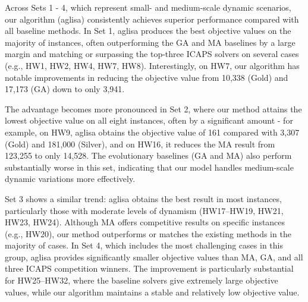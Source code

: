 \documentclass[preprint,12pt]{elsarticle}
\begin{document}
Across Sets 1 - 4, which represent small- and medium-scale dynamic scenarios, our algorithm (\gls{aglisa}) consistently achieves superior performance compared with all baseline methods. In Set 1, \gls{aglisa} produces the best objective values on the majority of instances, often outperforming the GA and MA baselines by a large margin and matching or surpassing the top-three ICAPS solvers on several cases (e.g., HW1, HW2, HW4, HW7, HW8). Interestingly, on HW7, our algorithm has notable improvements in reducing the objective value from 10,338 (Gold) and 17,173 (GA) down to only 3,941.

The advantage becomes more pronounced in Set 2, where our method attains the lowest objective value on all eight instances, often by a significant amount  - for example, on HW9, \gls{aglisa} obtains the objective value of 161 compared with 3,307 (Gold) and 181,000 (Silver), and on HW16, it reduces the MA result from 123,255 to only 14,528. The evolutionary baselines (GA and MA) also perform substantially worse in this set, indicating that our model handles medium-scale dynamic variations more effectively.

Set 3 shows a similar trend: \gls{aglisa} obtains the best result in most instances, particularly those with moderate levels of dynamism (HW17–HW19, HW21, HW23, HW24). Although MA offers competitive results on specific instances (e.g., HW20), our method outperforms or matches the existing methods in the majority of cases. In Set 4, which includes the most challenging cases in this group, \gls{aglisa} provides significantly smaller objective values than MA, GA, and all three ICAPS competition winners. The improvement is particularly substantial for HW25–HW32, where the baseline solvers give extremely large objective values, while our algorithm maintains a stable and relatively low objective value.
\end{document}
